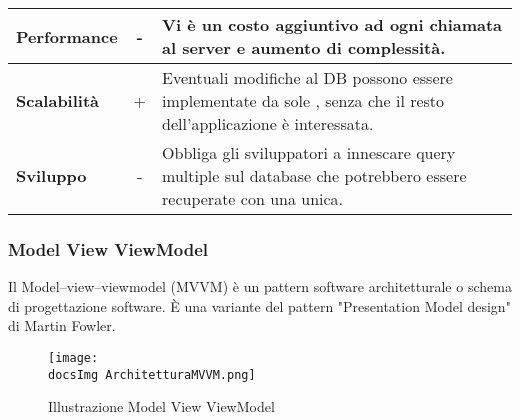 {{{\begin{itemize}
{\begin{tabular}{|l|c|l|}
						\hline
						\textbf{Performance} & - & Vi è un costo aggiuntivo ad ogni chiamata al server e aumento di complessità. \\
						\hline
						\textbf{Scalabilità} & + & Eventuali modifiche al DB possono essere implementate da sole , senza che il resto dell'applicazione è interessata. \\
						\hline
						\textbf{Sviluppo} & - & Obbliga gli sviluppatori a innescare query multiple sul database che potrebbero essere recuperate con una unica. \\
						\hline
					\end{tabular}
				}
			\end{itemize}
		}
	
		\subsubsection{Model View ViewModel}{
			Il Model–view–viewmodel (MVVM) è un pattern software architetturale o schema di progettazione software. È una variante del pattern "Presentation Model design" di Martin Fowler.
			
			\begin{figure}[ht]
				\centering
				\texttt{[image: \\docsImg ArchitetturaMVVM.png]}
				\caption{Illustrazione Model View ViewModel}
				\label{Illustrazione Model View ViewModel}
			\end{figure}
			
}}}
